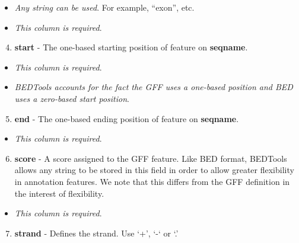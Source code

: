 \documentclass[letterpaper,10pt,english]{sphinxmanual}
\begin{document}
\begin{itemize}
\item {} 
\emph{Any string can be used}. For example, ``exon'', etc.

\item {} 
\emph{This column is required}.

\end{itemize}
\begin{enumerate}
\setcounter{enumi}{3}
\item {} 
\textbf{start} - The one-based starting position of feature on \textbf{seqname}.

\end{enumerate}
\begin{itemize}
\item {} 
\emph{This column is required}.

\item {} 
\emph{BEDTools accounts for the fact the GFF uses a one-based position and BED uses a zero-based start position}.

\end{itemize}
\begin{enumerate}
\setcounter{enumi}{4}
\item {} 
\textbf{end} - The one-based ending position of feature on \textbf{seqname}.

\end{enumerate}
\begin{itemize}
\item {} 
\emph{This column is required}.

\end{itemize}
\begin{enumerate}
\setcounter{enumi}{5}
\item {} 
\textbf{score} - A score assigned to the GFF feature. Like BED format, BEDTools allows any string to be stored in this field in order to allow greater flexibility in annotation features. We note that this differs from the GFF definition in the interest of flexibility.

\end{enumerate}
\begin{itemize}
\item {} 
\emph{This column is required}.

\end{itemize}
\begin{enumerate}
\setcounter{enumi}{6}
\item {} 
\textbf{strand} - Defines the strand. Use `+', `-` or `.'

\end{enumerate}
\end{document}
